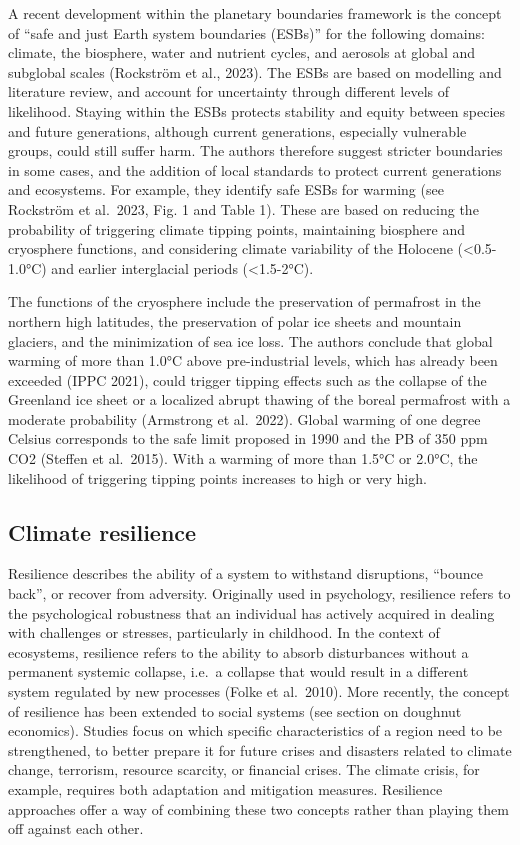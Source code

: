 \documentclass[
  a4paper,
  openany]{book}
\begin{document}
A recent development within the planetary boundaries framework is the
concept of ``safe and just Earth system boundaries (ESBs)'' for the
following domains: climate, the biosphere, water and nutrient cycles,
and aerosols at global and subglobal scales (Rockström et al., 2023).
The ESBs are based on modelling and literature review, and account for
uncertainty through different levels of likelihood. Staying within the
ESBs protects stability and equity between species and future
generations, although current generations, especially vulnerable groups,
could still suffer harm. The authors therefore suggest stricter
boundaries in some cases, and the addition of local standards to protect
current generations and ecosystems. For example, they identify safe ESBs
for warming (see Rockström et al.~2023, Fig. 1 and Table 1). These are
based on reducing the probability of triggering climate tipping points,
maintaining biosphere and cryosphere functions, and considering climate
variability of the Holocene (\textless0.5-1.0°C) and earlier
interglacial periods (\textless1.5-2°C).

The functions of the cryosphere include the preservation of permafrost
in the northern high latitudes, the preservation of polar ice sheets and
mountain glaciers, and the minimization of sea ice loss. The authors
conclude that global warming of more than 1.0°C above pre-industrial
levels, which has already been exceeded (IPPC 2021), could trigger
tipping effects such as the collapse of the Greenland ice sheet or a
localized abrupt thawing of the boreal permafrost with a moderate
probability (Armstrong et al.~2022). Global warming of one degree
Celsius corresponds to the safe limit proposed in 1990 and the PB of 350
ppm CO2 (Steffen et al.~2015). With a warming of more than 1.5°C or
2.0°C, the likelihood of triggering tipping points increases to high or
very high.

\subsection{Climate resilience}\label{climate-resilience}

Resilience describes the ability of a system to withstand disruptions,
``bounce back'', or recover from adversity. Originally used in
psychology, resilience refers to the psychological robustness that an
individual has actively acquired in dealing with challenges or stresses,
particularly in childhood. In the context of ecosystems, resilience
refers to the ability to absorb disturbances without a permanent
systemic collapse, i.e.~a collapse that would result in a different
system regulated by new processes (Folke et al.~2010). More recently,
the concept of resilience has been extended to social systems (see
section on doughnut economics). Studies focus on which specific
characteristics of a region need to be strengthened, to better prepare
it for future crises and disasters related to climate change, terrorism,
resource scarcity, or financial crises. The climate crisis, for example,
requires both adaptation and mitigation measures. Resilience approaches
offer a way of combining these two concepts rather than playing them off
against each other.
\end{document}
